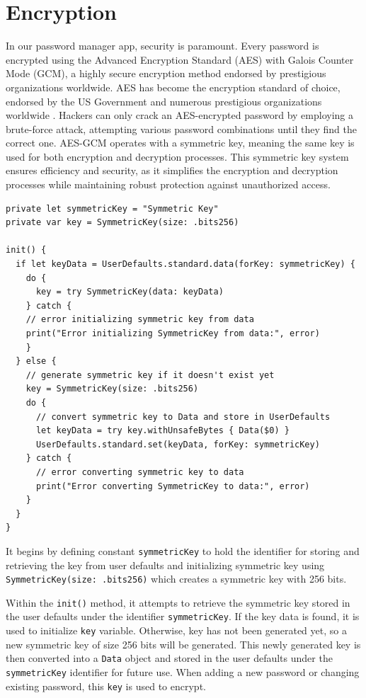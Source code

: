 \documentclass[10pt, titlepage]{article}
\begin{document}
\section*{Encryption}
In our password manager app, security is paramount. Every password is encrypted using the Advanced Encryption Standard (AES) with Galois Counter Mode (GCM), a highly secure encryption method endorsed by prestigious organizations worldwide. AES has become the encryption standard of choice, endorsed by the US Government and numerous prestigious organizations worldwide \cite{team_password}. Hackers can only crack an AES-encrypted password by employing a brute-force attack, attempting various password combinations until they find the correct one. AES-GCM operates with a symmetric key, meaning the same key is used for both encryption and decryption processes. This symmetric key system ensures efficiency and security, as it simplifies the encryption and decryption processes while maintaining robust protection against unauthorized access. 
\begin{center}
\begin{minipage}{\linewidth}
\begin{lstlisting}
private let symmetricKey = "Symmetric Key"
private var key = SymmetricKey(size: .bits256)

init() {
  if let keyData = UserDefaults.standard.data(forKey: symmetricKey) {
    do {
      key = try SymmetricKey(data: keyData)
    } catch {
    // error initializing symmetric key from data
    print("Error initializing SymmetricKey from data:", error)
    }
  } else {
    // generate symmetric key if it doesn't exist yet
    key = SymmetricKey(size: .bits256)
    do {
      // convert symmetric key to Data and store in UserDefaults
      let keyData = try key.withUnsafeBytes { Data($0) }
      UserDefaults.standard.set(keyData, forKey: symmetricKey)
    } catch {
      // error converting symmetric key to data
      print("Error converting SymmetricKey to data:", error)
    }
  }
}
\end{lstlisting}
\end{minipage}
\end{center}
It begins by defining constant \texttt{symmetricKey} to hold the identifier for storing and retrieving the key from user defaults and initializing symmetric key using \texttt{SymmetricKey(size: .bits256)} which creates a symmetric key with 256 bits. 

Within the \texttt{init()} method, it attempts to retrieve the symmetric key stored in the user defaults under the identifier \texttt{symmetricKey}. If the key data is found, it is used to initialize \texttt{key} variable. Otherwise, key has not been generated yet, so a new symmetric key of size 256 bits will be generated. This newly generated key is then converted into a \texttt{Data} object and stored in the user defaults under the \texttt{symmetricKey} identifier for future use. When adding a new password or changing existing password, this \texttt{key} is used to encrypt.
\end{document}
